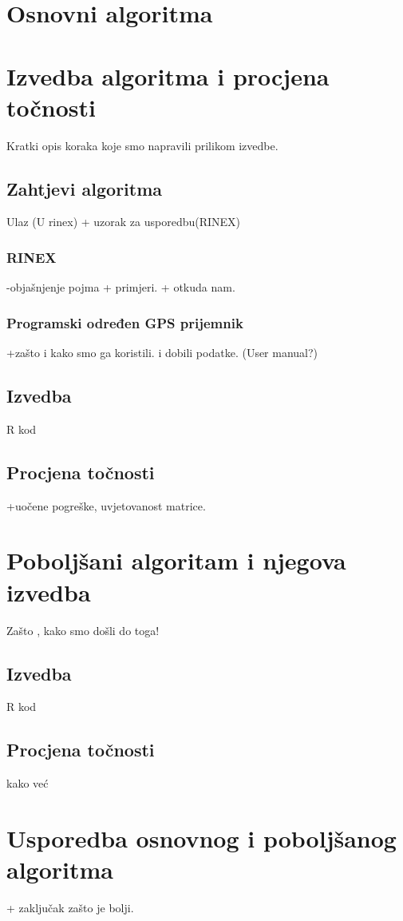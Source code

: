 \documentclass[a4paper,twoside,12pt]{memoir} %
\begin{document}
\section[Naslov sekcije u sadržaju][Kratki naslov sekcije]{Osnovni algoritma}
\section[Naslov sekcije u sadržaju][Kratki naslov sekcije]{Izvedba algoritma i procjena točnosti}
Kratki opis koraka koje smo napravili prilikom izvedbe.
\subsection{Zahtjevi algoritma}
Ulaz (U rinex) + uzorak za usporedbu(RINEX)
\subsubsection{RINEX}
-objašnjenje pojma + primjeri. + otkuda nam.
\subsubsection{Programski određen GPS prijemnik}
+zašto i kako smo ga koristili. i dobili podatke. (User manual?)

\subsection{Izvedba}
R kod
\subsection{Procjena točnosti}
+uočene pogreške, uvjetovanost matrice.
\section[Naslov sekcije u sadržaju][Kratki naslov sekcije]{Poboljšani algoritam i njegova izvedba}
Zašto , kako smo došli do toga!
\subsection{Izvedba}
R kod
\subsection{Procjena točnosti}
kako već

\section[Naslov sekcije u sadržaju][Kratki naslov sekcije]{Usporedba osnovnog i poboljšanog algoritma} + zaključak zašto je bolji.
\end{document}
